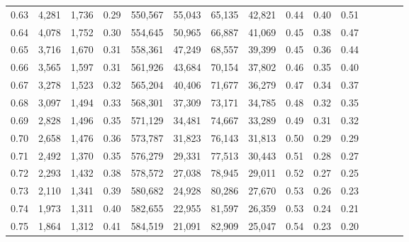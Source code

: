 \begin{tabular}{rrrcrrrrrrrrrrr}
0.63 &   4,281 &  1,736 &                                       0.29 &  550,567 &   55,043 &   65,135 &   42,821 &  0.44 &  0.40 &                         0.51 \\
0.64 &   4,078 &  1,752 &                                       0.30 &  554,645 &   50,965 &   66,887 &   41,069 &  0.45 &  0.38 &                         0.47 \\
0.65 &   3,716 &  1,670 &                                       0.31 &  558,361 &   47,249 &   68,557 &   39,399 &  0.45 &  0.36 &                         0.44 \\
0.66 &   3,565 &  1,597 &                                       0.31 &  561,926 &   43,684 &   70,154 &   37,802 &  0.46 &  0.35 &                         0.40 \\
0.67 &   3,278 &  1,523 &                                       0.32 &  565,204 &   40,406 &   71,677 &   36,279 &  0.47 &  0.34 &                         0.37 \\
0.68 &   3,097 &  1,494 &                                       0.33 &  568,301 &   37,309 &   73,171 &   34,785 &  0.48 &  0.32 &                         0.35 \\
0.69 &   2,828 &  1,496 &                                       0.35 &  571,129 &   34,481 &   74,667 &   33,289 &  0.49 &  0.31 &                         0.32 \\
0.70 &   2,658 &  1,476 &                                       0.36 &  573,787 &   31,823 &   76,143 &   31,813 &  0.50 &  0.29 &                         0.29 \\
0.71 &   2,492 &  1,370 &                                       0.35 &  576,279 &   29,331 &   77,513 &   30,443 &  0.51 &  0.28 &                         0.27 \\
0.72 &   2,293 &  1,432 &                                       0.38 &  578,572 &   27,038 &   78,945 &   29,011 &  0.52 &  0.27 &                         0.25 \\
0.73 &   2,110 &  1,341 &                                       0.39 &  580,682 &   24,928 &   80,286 &   27,670 &  0.53 &  0.26 &                         0.23 \\
0.74 &   1,973 &  1,311 &                                       0.40 &  582,655 &   22,955 &   81,597 &   26,359 &  0.53 &  0.24 &                         0.21 \\
0.75 &   1,864 &  1,312 &                                       0.41 &  584,519 &   21,091 &   82,909 &   25,047 &  0.54 &  0.23 &                         0.20 \\

\end{tabular}
